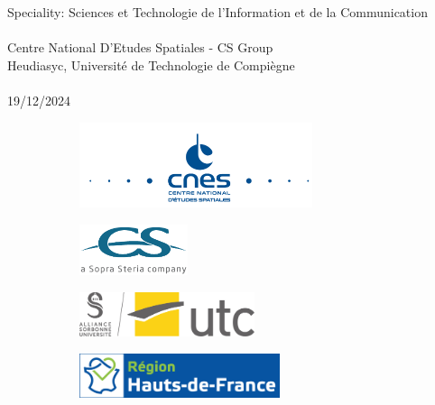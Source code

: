 \begin{titlepage}
\begin{center}
        \vspace{1cm}
        Speciality: Sciences et Technologie de l'Information et de la Communication\\~\\
        Centre National D'Etudes Spatiales - CS Group \\
        Heudiasyc, Université de Technologie de Compiègne\\
        ~\\
        19/12/2024
        \
        \begin{figure}[hb]
            \begin{subfigure}[b]{0.3\linewidth}
                \centering
                \includegraphics[height=2.5cm]{Images/General/Logo_CNES.png}
            \end{subfigure}\hfill
            \begin{subfigure}[b]{0.3\linewidth}
                \centering
                \includegraphics[height=1.5cm]{Images/General/Logo_CS.png}
            \end{subfigure}
        \end{figure}
        \begin{figure}
            \begin{subfigure}[b]{0.3\linewidth}
                \centering
                \includegraphics[height=1.3cm]{Images/General/Logo_UTC.jpg}
            \end{subfigure}\hfill
            \begin{subfigure}[b]{0.3\linewidth}
                \centering
                \includegraphics[height=1.3cm]{Images/General/Logo Région HDF - partenaire.jpg}
            \end{subfigure}
        \end{figure}
    \end{center}
\end{titlepage}
